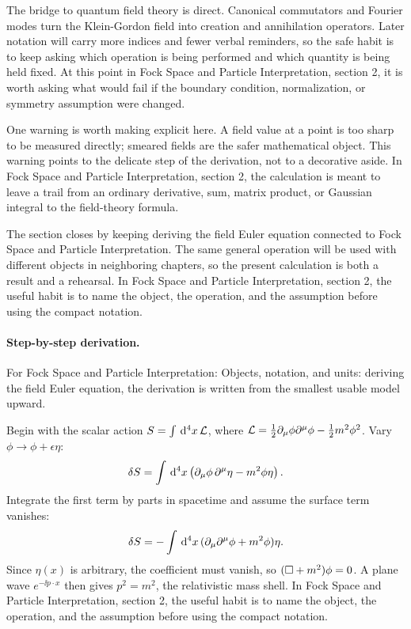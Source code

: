 The bridge to quantum field theory is direct.  Canonical commutators and Fourier modes turn the Klein-Gordon field into creation and annihilation operators.  Later notation will carry more indices and fewer verbal reminders, so the safe habit is to keep asking which operation is being performed and which quantity is being held fixed.  At this point in Fock Space and Particle Interpretation, section 2, it is worth asking what would fail if the boundary condition, normalization, or symmetry assumption were changed.

One warning is worth making explicit here.  A field value at a point is too sharp to be measured directly; smeared fields are the safer mathematical object.  This warning points to the delicate step of the derivation, not to a decorative aside.  In Fock Space and Particle Interpretation, section 2, the calculation is meant to leave a trail from an ordinary derivative, sum, matrix product, or Gaussian integral to the field-theory formula.

The section closes by keeping deriving the field Euler equation connected to Fock Space and Particle Interpretation.  The same general operation will be used with different objects in neighboring chapters, so the present calculation is both a result and a rehearsal.  In Fock Space and Particle Interpretation, section 2, the useful habit is to name the object, the operation, and the assumption before using the compact notation.



\paragraph{Step-by-step derivation.}

For Fock Space and Particle Interpretation: Objects, notation, and units: deriving the field Euler equation, the derivation is written from the smallest usable model upward.

Begin with the scalar action \(S=\int\,\mathrm d^4x\,\mathcal L\), where \(\mathcal L=\frac12\partial_\mu\phi\partial^\mu\phi-\frac12m^2\phi^2\).  Vary \(\phi\to\phi+\epsilon\eta\):
\[
  \delta S=\int\,\mathrm d^4x\left(\partial_\mu\phi\,\partial^\mu\eta-m^2\phi\eta\right).
\]
Integrate the first term by parts in spacetime and assume the surface term vanishes:
\[
  \delta S=-\int\,\mathrm d^4x\,(\partial_\mu\partial^\mu\phi+m^2\phi)\eta.
\]
Since \(\eta(x)\) is arbitrary, the coefficient must vanish, so \((\Box+m^2)\phi=0\).  A plane wave \(e^{-\ii p\cdot x}\) then gives \(p^2=m^2\), the relativistic mass shell.  In Fock Space and Particle Interpretation, section 2, the useful habit is to name the object, the operation, and the assumption before using the compact notation.

